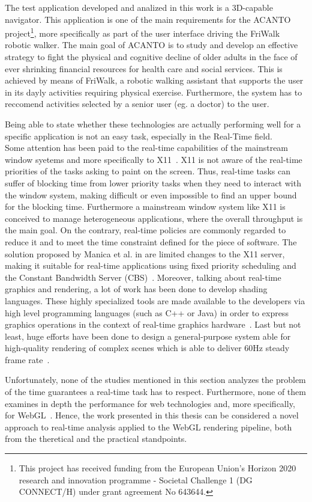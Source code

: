 The test application developed and analized in this work is a 3D-capable navigator.
This application is one of the main requirements for the ACANTO~\cite{acanto}
project\footnote{This project has received funding from the European Union’s Horizon
2020 research and innovation programme - Societal Challenge 1 (DG CONNECT/H) under 
grant agreement No 643644.}, more specifically as part of the user interface driving
the FriWalk robotic walker.
The main goal of ACANTO is to study and develop an effective strategy to fight the
physical and cognitive decline of older adults in the face of ever shrinking financial
resources for health care and social services. This is achieved by means of FriWalk,
a robotic walking assistant that supports the user in its dayly activities requiring
physical exercise. Furthermore, the system has to reccomend activities selected 
by a senior user (eg. a doctor) to the user.

Being able to state whether these technologies are actually performing well for
a specific application is not an easy task, especially in the Real-Time field.\\
Some attention has been paid to the real-time capabilities of the mainstream window
syetems and more specifically to X11~\cite{manica2008qos}. X11 is not aware of the
real-time priorities of the tasks asking to paint on the screen. Thus, real-time
tasks can suffer of blocking time from lower priority tasks when they need to
interact with the window system, making difficult or even impossible to find an
upper bound for the blocking time. Furthermore a mainstream window system like X11
is conceived to manage heterogeneous applications, where the overall throughput
is the main goal. On the contrary, real-time policies are commonly regarded to
reduce it and to meet the time constraint defined for the piece of software.
The solution proposed by Manica et al. in \cite{manica2008qos} are limited
changes to the X11 server, making it suitable for real-time applications using
fixed priority scheduling and the Constant Bandwidth Server
(CBS)~\cite{buttazzo2006optimal}. Moreover, talking about real-time graphics and rendering, a lot of work has been
done to develop shading languages. These highly specialized tools
are made available to the developers via high level programming languages
(such as C++ or Java) in order to express graphics operations in the context
of real-time graphics hardware~\cite{Fernando:2003:CTD:862247}. Last but not least,
huge efforts have been done to design a general-purpose system able for high-quality
rendering of complex scenes which is able to deliver 60Hz steady frame
rate~\cite{Montrym:1997:IRG:258734.258871}.

Unfortunately, none of the studies mentioned in this section analyzes the problem
of the time guarantees a real-time task has to respect. Furthermore, none of them
examines in depth the performance for web technologies and, more specifically,
for WebGL~\cite{webgl}. Hence, the work presented in this thesis can be considered
a novel approach to real-time analysis applied to the WebGL rendering pipeline,
both from the theretical and the practical standpoints.

